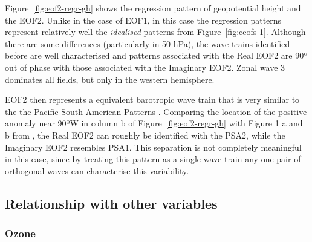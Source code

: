 \documentclass[smallextended]{svjour3}       %
\begin{document}
Figure~\ref{fig:eof2-regr-gh} shows the regression pattern of geopotential height and the EOF2. Unlike in the case of EOF1, in this case the regression patterns represent relatively well the \emph{idealised} patterns from Figure~\ref{fig:ceofs-1}. Although there are some differences (particularly in 50 hPa), the wave trains identified before are well characterised and patterns associated with the Real EOF2 are 90º out of phase with those associated with the Imaginary EOF2. Zonal wave 3 dominates all fields, but only in the western hemisphere.

EOF2 then represents a equivalent barotropic wave train that is very similar to the the Pacific South American Patterns \citep{mo2001}. Comparing the location of the positive anomaly near 90ºW in column b of Figure~\ref{fig:eof2-regr-gh} with Figure 1 a and b from \citet{mo2001}, the Real EOF2 can roughly be identified with the PSA2, while the Imaginary EOF2 resembles PSA1. This separation is not completely meaningful in this case, since by treating this pattern as a single wave train any one pair of orthogonal waves can characterise this variability.

\hypertarget{relationship-with-other-variables}{%
\subsection{Relationship with other variables}\label{relationship-with-other-variables}}

\hypertarget{ozone}{%
\subsubsection{Ozone}\label{ozone}}
\end{document}
